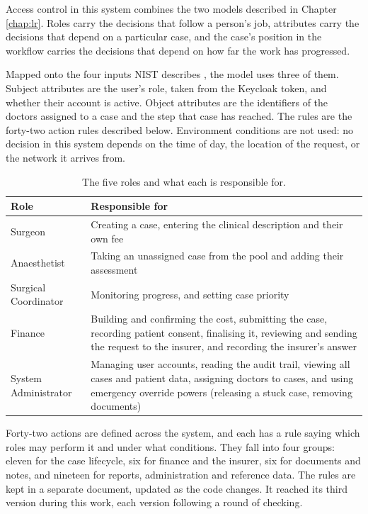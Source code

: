 Access control in this system combines the two models described in Chapter \ref{chap:lr}. Roles carry the decisions that follow a person's job, attributes carry the decisions that depend on a particular case, and the case's position in the workflow carries the decisions that depend on how far the work has progressed.

Mapped onto the four inputs NIST describes \cite{nist80162}, the model uses three of them. Subject attributes are the user's role, taken from the Keycloak token, and whether their account is active. Object attributes are the identifiers of the doctors assigned to a case and the step that case has reached. The rules are the forty-two action rules described below. Environment conditions are not used: no decision in this system depends on the time of day, the location of the request, or the network it arrives from.

\begin{table}[H]
\centering
\caption{The five roles and what each is responsible for.}
\label{tab:roles}
\begin{tabular}{|p{4.5cm}|p{9.4cm}|}
\hline
\textbf{Role} & \textbf{Responsible for} \\
\hline
Surgeon & Creating a case, entering the clinical description and their own fee \\
\hline
Anaesthetist & Taking an unassigned case from the pool and adding their assessment \\
\hline
Surgical Coordinator & Monitoring progress, and setting case priority \\
\hline
Finance & Building and confirming the cost, submitting the case, recording patient consent, finalising it, reviewing and sending the request to the insurer, and recording the insurer's answer \\
\hline
System Administrator & Managing user accounts, reading the audit trail, viewing all cases and patient data, assigning doctors to cases, and using emergency override powers (releasing a stuck case, removing documents) \\
\hline
\end{tabular}
\end{table}

Forty-two actions are defined across the system, and each has a rule saying which roles may perform it and under what conditions. They fall into four groups: eleven for the case lifecycle, six for finance and the insurer, six for documents and notes, and nineteen for reports, administration and reference data. The rules are kept in a separate document, updated as the code changes. It reached its third version during this work, each version following a round of checking.

